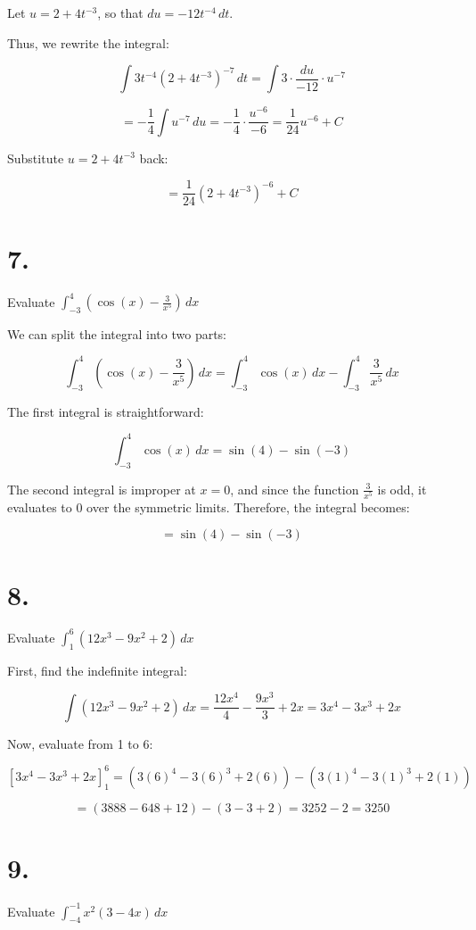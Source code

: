 \documentclass{article}
\begin{document}
Let \( u = 2 + 4t^{-3} \), so that \( du = -12t^{-4} \, dt \).

Thus, we rewrite the integral:

\[
\int 3t^{-4} (2 + 4t^{-3})^{-7} \, dt = \int 3 \cdot \frac{du}{-12} \cdot u^{-7}
\]

\[
= -\frac{1}{4} \int u^{-7} \, du = -\frac{1}{4} \cdot \frac{u^{-6}}{-6} = \frac{1}{24} u^{-6} + C
\]

Substitute \( u = 2 + 4t^{-3} \) back:

\[
= \frac{1}{24} (2 + 4t^{-3})^{-6} + C
\]
\section*{7.}
Evaluate \( \int_{-3}^{4} \left( \cos(x) - \frac{3}{x^5} \right) \, dx \)

We can split the integral into two parts:

\[
\int_{-3}^{4} \left( \cos(x) - \frac{3}{x^5} \right) \, dx = \int_{-3}^{4} \cos(x) \, dx - \int_{-3}^{4} \frac{3}{x^5} \, dx
\]

The first integral is straightforward:

\[
\int_{-3}^{4} \cos(x) \, dx = \sin(4) - \sin(-3)
\]

The second integral is improper at \( x = 0 \), and since the function \( \frac{3}{x^5} \) is odd, it evaluates to 0 over the symmetric limits. Therefore, the integral becomes:

\[
= \sin(4) - \sin(-3)
\]
\section*{8.}
Evaluate \( \int_{1}^{6} \left( 12x^3 - 9x^2 + 2 \right) \, dx \)

First, find the indefinite integral:

\[
\int \left( 12x^3 - 9x^2 + 2 \right) \, dx = \frac{12x^4}{4} - \frac{9x^3}{3} + 2x = 3x^4 - 3x^3 + 2x
\]

Now, evaluate from 1 to 6:

\[
\left[ 3x^4 - 3x^3 + 2x \right]_{1}^{6} = \left( 3(6)^4 - 3(6)^3 + 2(6) \right) - \left( 3(1)^4 - 3(1)^3 + 2(1) \right)
\]

\[
= (3888 - 648 + 12) - (3 - 3 + 2) = 3252 - 2 = 3250
\]
\section*{9.}
Evaluate \( \int_{-4}^{-1} x^2 (3 - 4x) \, dx \)
\end{document}
